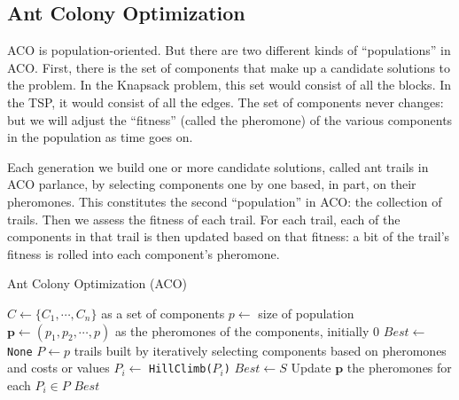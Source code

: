             \subsection{Ant Colony Optimization}
                ACO is population-oriented. But there are two different kinds of ``populations'' in ACO. First, there is the set of components that make up a candidate solutions to the problem. In the Knapsack problem, this set would consist of all the blocks. In the TSP, it would consist of all the edges. The set of components never changes: but we will adjust the ``fitness'' (called the pheromone) of the various components in the population as time goes on.

                Each generation we build one or more candidate solutions, called ant trails in ACO parlance, by selecting components one by one based, in part, on their pheromones. This constitutes the second ``population'' in ACO: the collection of trails. Then we assess the fitness of each trail. For each trail, each of the components in that trail is then updated based on that fitness: a bit of the trail’s fitness is rolled into each component’s pheromone.

                \begin{algorithm}[!htp]
                    \centering
                    \caption{Ant Colony Optimization (ACO)}
                    \begin{algorithmic}[1]
                        \State $C \gets \{C_1, \cdots, C_n\}$ as a set of components
                        \State $p \gets$ size of population
                        \State $\mathbf{p} \gets (p_1, p_2, \cdots, p)$ as the pheromones of the components, initially 0
                        \State $Best \gets$ \texttt{None}
                            \State $P \gets p$ trails built by iteratively selecting components based on pheromones and costs or values
                                \State $P_i \gets$ \texttt{HillClimb($P_i$)}
                                    \State $Best \gets S$
                                \EndIf
                            \EndFor
                            \State Update $\mathbf{p}$ the pheromones for each $P_i \in P$
                        \EndWhile
                        \State \Return $Best$
                    \end{algorithmic}
                \end{algorithm}

